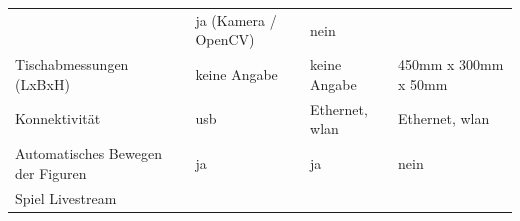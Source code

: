 \begin{longtable}[]{@{}llll@{}}
\begin{minipage}[t]{0.24\columnwidth}
\end{minipage} & \begin{minipage}[t]{0.26\columnwidth}\raggedright
ja (Kamera / OpenCV)\strut
\end{minipage} & \begin{minipage}[t]{0.19\columnwidth}\raggedright
nein\strut
\end{minipage}\tabularnewline
\begin{minipage}[t]{0.20\columnwidth}\raggedright
Tischabmessungen (LxBxH)\strut
\end{minipage} & \begin{minipage}[t]{0.24\columnwidth}\raggedright
keine Angabe\strut
\end{minipage} & \begin{minipage}[t]{0.26\columnwidth}\raggedright
keine Angabe\strut
\end{minipage} & \begin{minipage}[t]{0.19\columnwidth}\raggedright
450mm x 300mm x 50mm\strut
\end{minipage}\tabularnewline
\begin{minipage}[t]{0.20\columnwidth}\raggedright
Konnektivität\strut
\end{minipage} & \begin{minipage}[t]{0.24\columnwidth}\raggedright
\gls{usb}\strut
\end{minipage} & \begin{minipage}[t]{0.26\columnwidth}\raggedright
Ethernet, \gls{wlan}\strut
\end{minipage} & \begin{minipage}[t]{0.19\columnwidth}\raggedright
Ethernet, \gls{wlan}\strut
\end{minipage}\tabularnewline
\begin{minipage}[t]{0.20\columnwidth}\raggedright
Automatisches Bewegen der Figuren\strut
\end{minipage} & \begin{minipage}[t]{0.24\columnwidth}\raggedright
ja\strut
\end{minipage} & \begin{minipage}[t]{0.26\columnwidth}\raggedright
ja\strut
\end{minipage} & \begin{minipage}[t]{0.19\columnwidth}\raggedright
nein\strut
\end{minipage}\tabularnewline
\begin{minipage}[t]{0.20\columnwidth}\raggedright
Spiel Livestream\strut
\end{minipage} & \begin{minipage}[t]{0.24\columnwidth}\raggedright

\end{minipage}
\end{longtable}
